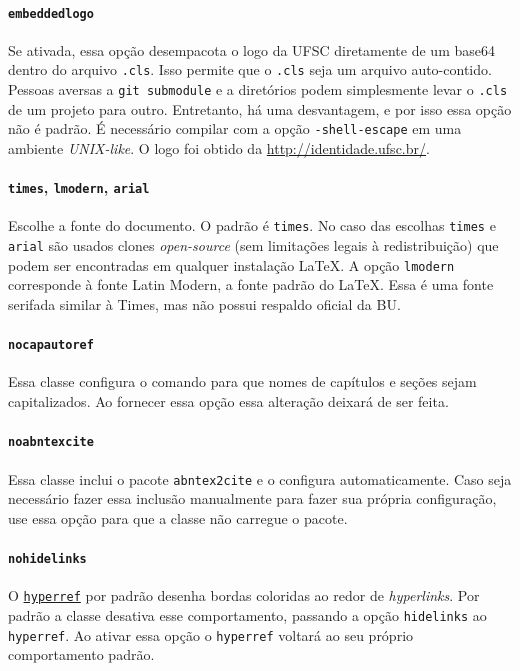 \documentclass[embeddedlogo]{../ufsc-thesis-rn46-2019}
\begin{document}
\paragraph*{\texttt{embeddedlogo}} Se ativada, essa opção desempacota o logo da
UFSC diretamente de um base64 dentro do arquivo \texttt{.cls}. Isso permite que
o \texttt{.cls} seja um arquivo auto-contido. Pessoas aversas a \texttt{git
submodule} e a diretórios podem simplesmente levar o \texttt{.cls} de um
projeto para outro. Entretanto, há uma desvantagem, e por isso essa opção não é
padrão. É necessário compilar com a opção \texttt{-shell-escape} em uma
ambiente \emph{UNIX-like}. O logo foi obtido da \href{página de identidade
visual da UFSC}{http://identidade.ufsc.br/}.

\paragraph*{\texttt{times}, \texttt{lmodern}, \texttt{arial}} Escolhe a fonte
do documento. O padrão é \texttt{times}. No caso das escolhas \texttt{times} e
\texttt{arial} são usados clones \emph{open-source} (sem limitações legais à
redistribuição) que podem ser encontradas em qualquer instalação \LaTeX. A
opção \texttt{lmodern} corresponde à fonte Latin Modern, a fonte padrão do
\LaTeX. Essa é uma fonte serifada similar à Times, mas não possui respaldo
oficial da BU.

\paragraph*{\texttt{nocapautoref}} Essa classe configura o comando
\mt{\autoref} para que nomes de capítulos e seções sejam capitalizados. Ao
fornecer essa opção essa alteração deixará de ser feita.

\paragraph*{\texttt{noabntexcite}} Essa classe inclui o pacote
\texttt{abntex2cite} e o configura automaticamente. Caso seja necessário fazer
essa inclusão manualmente para fazer sua própria configuração, use essa opção
para que a classe não carregue o pacote.

\paragraph*{\texttt{nohidelinks}} O
\href{https://ctan.org/pkg/hyperref}{\texttt{hyperref}} por padrão desenha
bordas coloridas ao redor de \emph{hyperlinks}. Por padrão a classe desativa
esse comportamento, passando a opção \texttt{hidelinks} ao \texttt{hyperref}.
Ao ativar essa opção o \texttt{hyperref} voltará ao seu próprio comportamento
padrão.
\end{document}
